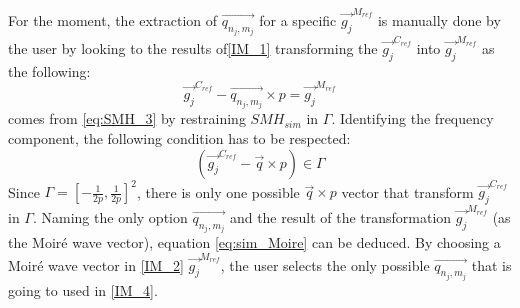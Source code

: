 \documentclass[12pt]{article}
\begin{document}
For the moment, the extraction of $\overrightarrow{q_{n_j,m_j}}$ for a specific $ \overrightarrow{g_j}^{M_{ref}}$ is manually done by the user by looking to the results of\cref{IM_1} transforming the $\overrightarrow{g_j}^{C_{ref}}$ into $\overrightarrow{g_j}^{M_{ref}}$ as the following:
\begin{equation}
\label{eq:sim_Moire}
{\overrightarrow{g_j}^{C_{ref}}}-\overrightarrow{q_{n_j,m_j}}\times p =  \overrightarrow{g_j}^{M_{ref}}
\end{equation}
 comes from \cref{eq:SMH_3} by restraining $SMH_{sim}$ in $\Gamma$. Identifying the frequency component, the following condition has to be respected:
\begin{equation*}
(\overrightarrow{g_j}^{C_{ref}}-\overrightarrow{q}\times p) \in \Gamma
\end{equation*}
Since $\Gamma = [-\frac{1}{2p},\frac{1}{2p}]^{2}$, there is only one possible $\overrightarrow{q}\times p$ vector that transform $\overrightarrow{g_j}^{C_{ref}}$ in $\Gamma$. Naming the only option $\overrightarrow{q_{n_j,m_j}}$ and the result of the transformation $\overrightarrow{g_j}^{M_{ref}}$ (as the Moir{\'e} wave vector), equation \cref{eq:sim_Moire} can be deduced. By choosing a Moir{\'e} wave vector in \cref{IM_2} $\overrightarrow{g_j}^{M_{ref}}$, the user selects the only possible $\overrightarrow{q_{n_j,m_j}}$ that is going to used in \cref{IM_4}.
\end{document}
